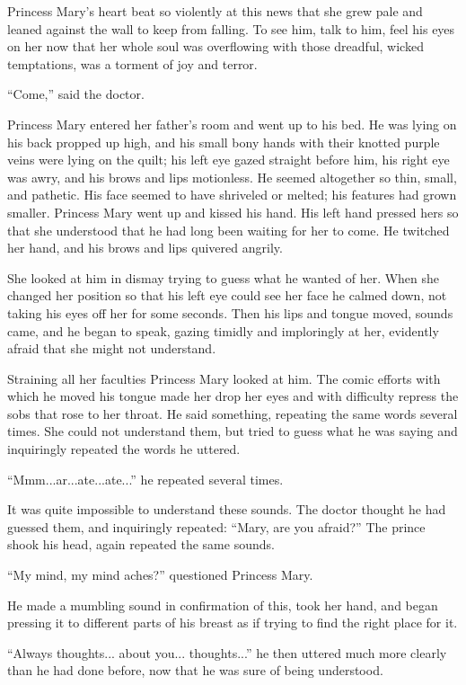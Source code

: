 Princess Mary's heart beat so violently at this news that she
grew pale and leaned against the wall to keep from falling. To
see him, talk to him, feel his eyes on her now that her whole
soul was overflowing with those dreadful, wicked temptations, was
a torment of joy and terror.

``Come,'' said the doctor.

Princess Mary entered her father's room and went up to his
bed. He was lying on his back propped up high, and his small bony
hands with their knotted purple veins were lying on the quilt;
his left eye gazed straight before him, his right eye was awry,
and his brows and lips motionless. He seemed altogether so thin,
small, and pathetic. His face seemed to have shriveled or melted;
his features had grown smaller.  Princess Mary went up and kissed
his hand. His left hand pressed hers so that she understood that
he had long been waiting for her to come. He twitched her hand,
and his brows and lips quivered angrily.

She looked at him in dismay trying to guess what he wanted of
her. When she changed her position so that his left eye could see
her face he calmed down, not taking his eyes off her for some
seconds. Then his lips and tongue moved, sounds came, and he
began to speak, gazing timidly and imploringly at her, evidently
afraid that she might not understand.

Straining all her faculties Princess Mary looked at him. The
comic efforts with which he moved his tongue made her drop her
eyes and with difficulty repress the sobs that rose to her
throat. He said something, repeating the same words several
times. She could not understand them, but tried to guess what he
was saying and inquiringly repeated the words he uttered.

``Mmm...ar...ate...ate...'' he repeated several times.

It was quite impossible to understand these sounds. The doctor
thought he had guessed them, and inquiringly repeated: ``Mary,
are you afraid?''  The prince shook his head, again repeated the
same sounds.

``My mind, my mind aches?'' questioned Princess Mary.

He made a mumbling sound in confirmation of this, took her hand,
and began pressing it to different parts of his breast as if
trying to find the right place for it.

``Always thoughts... about you... thoughts...'' he then uttered
much more clearly than he had done before, now that he was sure
of being understood.

